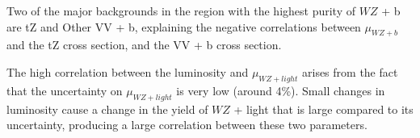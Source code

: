Two of the major backgrounds in the region with the highest purity of $WZ$ + b are tZ and Other VV + b, explaining the negative correlations between $\mu_{WZ+b}$ and the tZ cross section, and the VV + b cross section.

The high correlation between the luminosity and $\mu_{WZ+light}$ arises from the fact that the uncertainty on $\mu_{WZ+light}$ is very low (around 4\%). Small changes in luminosity cause a change in the yield of $WZ$ + light that is large compared to its uncertainty, producing a large correlation between these two parameters. 



%        



